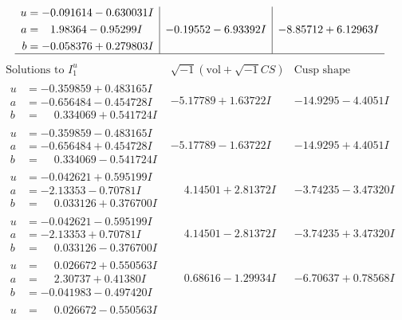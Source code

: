 \documentclass[1p]{elsarticle_modified}
\theoremstyle{definition}
\newcommand{\I}{\sqrt{-1}}
\begin{document}
$$\begin{array}{c|c|c}
\begin{aligned}
u &= -0.091614 - 0.630031 I \\
a &= \phantom{-}1.98364 - 0.95299 I \\
b &= -0.058376 + 0.279803 I\end{aligned}
 & -0.19552 - 6.93392 I & -8.85712 + 6.12963 I\\
 \hline 
 \end{array}$$\newpage$$\begin{array}{c|c|c}  
\text{Solutions to }I^u_{1}& \I (\text{vol} + \sqrt{-1}CS) & \text{Cusp shape}\\
 \hline 
\begin{aligned}
u &= -0.359859 + 0.483165 I \\
a &= -0.656484 - 0.454728 I \\
b &= \phantom{-}0.334069 + 0.541724 I\end{aligned}
 & -5.17789 + 1.63722 I & -14.9295 - 4.4051 I \\ \hline\begin{aligned}
u &= -0.359859 - 0.483165 I \\
a &= -0.656484 + 0.454728 I \\
b &= \phantom{-}0.334069 - 0.541724 I\end{aligned}
 & -5.17789 - 1.63722 I & -14.9295 + 4.4051 I \\ \hline\begin{aligned}
u &= -0.042621 + 0.595199 I \\
a &= -2.13353 - 0.70781 I \\
b &= \phantom{-}0.033126 + 0.376700 I\end{aligned}
 & \phantom{-}4.14501 + 2.81372 I & -3.74235 - 3.47320 I \\ \hline\begin{aligned}
u &= -0.042621 - 0.595199 I \\
a &= -2.13353 + 0.70781 I \\
b &= \phantom{-}0.033126 - 0.376700 I\end{aligned}
 & \phantom{-}4.14501 - 2.81372 I & -3.74235 + 3.47320 I \\ \hline\begin{aligned}
u &= \phantom{-}0.026672 + 0.550563 I \\
a &= \phantom{-}2.30737 + 0.41380 I \\
b &= -0.041983 - 0.497420 I\end{aligned}
 & \phantom{-}0.68616 - 1.29934 I & -6.70637 + 0.78568 I \\ \hline\begin{aligned}
u &= \phantom{-}0.026672 - 0.550563 I \\

\end{aligned}
\end{array}$$
\end{document}
